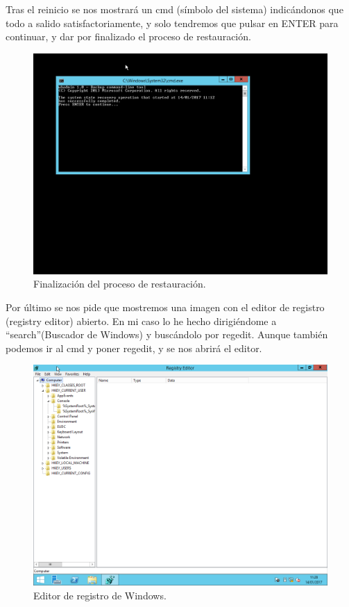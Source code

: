 \newpage
Tras el reinicio se nos mostrará un cmd (símbolo del sistema) indicándonos que todo a salido satisfactoriamente, y solo tendremos que pulsar en ENTER para continuar, y dar por finalizado el proceso de restauración.
\begin{figure}[H]
	\begin{center}
		\includegraphics[width=15cm]{Imagenes/Fin_restauracion}
		\caption{Finalización del proceso de restauración.}
		\label{fig:20}
	\end{center}
\end{figure}

\newpage
Por último se nos pide que mostremos una imagen con el editor de registro (registry editor) abierto. En mi caso lo he hecho dirigiéndome a ``search''(Buscador de Windows) y buscándolo por regedit. Aunque también podemos ir al cmd y poner regedit, y se nos abrirá el editor.

\begin{figure}[H]
	\begin{center}
		\includegraphics[width=15cm]{Imagenes/Editor_registro}
		\caption{Editor de registro de Windows.}
		\label{fig:21}
	\end{center}
\end{figure}

